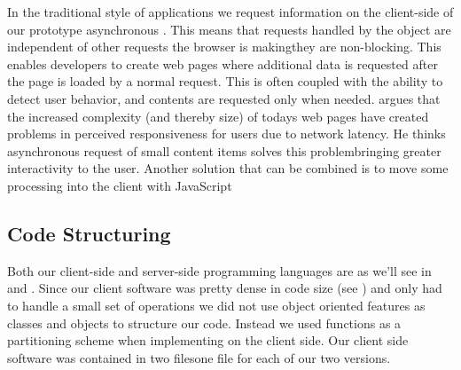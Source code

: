 In the traditional style of  applications we request information on
the client-side of our prototype asynchronous%
.
This means that requests handled by the  object
are independent of other requests the browser is making\dash{}they
are non-blocking. This enables developers to create web pages where additional
data is requested after the page is loaded by a normal  request.
This is often coupled with the ability to detect user behavior, and contents
are requested only when needed. \citet[pp.281--282]{stamey06} argues that
the increased complexity (and thereby size) of todays web pages have created
problems in perceived responsiveness for users due to network latency. He
thinks asynchronous request of small content items solves this
problem\dash{}bringing greater interactivity to the user. Another solution
that can be combined is to move some processing into the client with
JavaScript \citep[]{jazayeri07}

\subsection{Code Structuring}

Both our client-side and server-side programming languages are as we'll see in
 and
.
Since our client software was pretty dense in code size (see
) and only had to handle a small set of
operations we did not use object oriented
features as classes and objects to structure our code. Instead we used
functions as a partitioning scheme when implementing on the client side.
Our client side software was contained in two files\dash{}one file for each
of our two versions.

